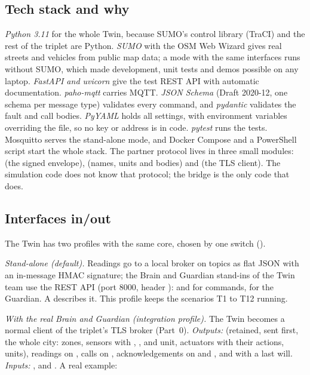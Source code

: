\subsection{Tech stack and why}
\emph{Python 3.11} for the whole Twin, because SUMO's control library (TraCI) and the rest of the triplet are Python. \emph{SUMO} with the OSM Web Wizard gives real streets and
vehicles from public map data; a  mode with the same interfaces runs without SUMO, which made development, unit tests and demos possible on any laptop.
\emph{FastAPI and uvicorn} give the test REST API with automatic documentation. \emph{paho-mqtt} carries MQTT. \emph{JSON Schema} (Draft 2020-12, one schema per message type) validates every
command, and \emph{pydantic} validates the fault and call bodies. \emph{PyYAML} holds all settings, with environment variables overriding the file, so no key or address is in code.
\emph{pytest} runs the tests. Mosquitto serves the stand-alone mode, and Docker Compose and a PowerShell script start the whole stack.
The partner protocol lives in three small modules:  (the signed envelope),  (names, units and bodies) and  (the TLS client). The simulation code does not know
that protocol; the bridge is the only code that does.

\subsection{Interfaces in/out}
The Twin has two profiles with the same core, chosen by one switch ().

\emph{Stand-alone (default).} Readings go to a local broker on topics  as flat JSON with an in-message HMAC signature; the Brain and Guardian stand-ins of
the Twin team use the REST API (port 8000, header ):  and  for commands,  for the Guardian.
A  describes it. This profile keeps the scenarios T1 to T12 running.

\emph{With the real Brain and Guardian (integration profile).} The Twin becomes a normal client of the triplet's TLS broker (Part~0). \emph{Outputs:}
 (retained, sent first, the whole city: zones, sensors with , ,  and unit, actuators with their actions, units),
readings on , calls on , acknowledgements on  and , and 
with a last will. \emph{Inputs:} ,  and . A real example:

